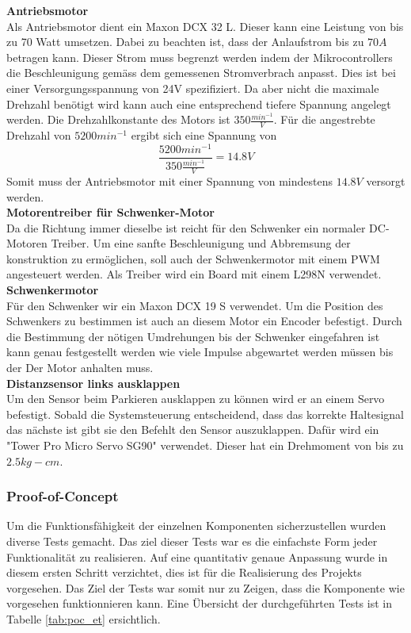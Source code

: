 \documentclass[../../main.tex]{subfiles}
\begin{document}
    \textbf{Antriebsmotor}\\
    Als Antriebsmotor dient ein Maxon DCX 32 L. Dieser kann eine Leistung von bis zu 70 Watt umsetzen. Dabei zu beachten ist, dass der Anlaufstrom bis zu $70A$ betragen kann. Dieser Strom muss begrenzt werden indem der Mikrocontrollers die Beschleunigung gemäss dem gemessenen Stromverbrach anpasst.\cite{MaxonDCX32L} Dies ist bei einer Versorgungsspannung von 24V spezifiziert. Da aber nicht die maximale Drehzahl benötigt wird kann auch eine entsprechend tiefere Spannung angelegt werden. Die Drehzahlkonstante des Motors ist $350 \frac{min^{-1}}{V}$. Für die angestrebte Drehzahl von $5200min^{-1}$ ergibt sich eine Spannung von $$\frac{5200min^{-1}}{350 \frac{min^{-1}}{V}} =14.8V$$ Somit muss der Antriebsmotor mit einer Spannung von mindestens $14.8V$ versorgt werden.\\ 

    \textbf{Motorentreiber für Schwenker-Motor}\\
    Da die Richtung immer dieselbe ist reicht für den Schwenker ein normaler DC-Motoren Treiber. Um eine sanfte Beschleunigung und Abbremsung der konstruktion zu ermöglichen, soll auch der Schwenkermotor mit einem PWM angesteuert werden. Als Treiber wird ein Board mit einem L298N verwendet.\\

    \textbf{Schwenkermotor}\\
    Für den Schwenker wir ein Maxon DCX 19 S verwendet. Um die Position des Schwenkers zu bestimmen ist auch an diesem Motor ein Encoder befestigt. Durch die Bestimmung der nötigen Umdrehungen bis der Schwenker eingefahren ist kann genau festgestellt werden wie viele Impulse abgewartet werden müssen bis der Der Motor anhalten muss. \cite{MaxonDCX19S}\\

    \textbf{Distanzsensor links ausklappen}\\
    Um den Sensor beim Parkieren ausklappen zu können wird er an einem Servo befestigt. Sobald die Systemsteuerung entscheidend, dass das korrekte Haltesignal das nächste ist gibt sie den Befehlt den Sensor auszuklappen. Dafür wird ein "Tower Pro Micro Servo SG90" verwendet. Dieser hat ein Drehmoment von bis zu $2.5 kg-cm$. \cite{SG90Datasheet}\\

    \subsubsection{Proof-of-Concept}
    Um die Funktionsfähigkeit der einzelnen Komponenten sicherzustellen wurden diverse Tests gemacht. Das ziel dieser Tests war es die einfachste Form jeder Funktionalität zu realisieren. Auf eine quantitativ genaue Anpassung wurde in diesem ersten Schritt verzichtet, dies ist für die Realisierung des Projekts vorgesehen. Das Ziel der Tests war somit nur zu Zeigen, dass die Komponente wie vorgesehen funktionnieren kann. Eine Übersicht der durchgeführten Tests ist in Tabelle \ref{tab:poc_et} ersichtlich.\\
\end{document}
